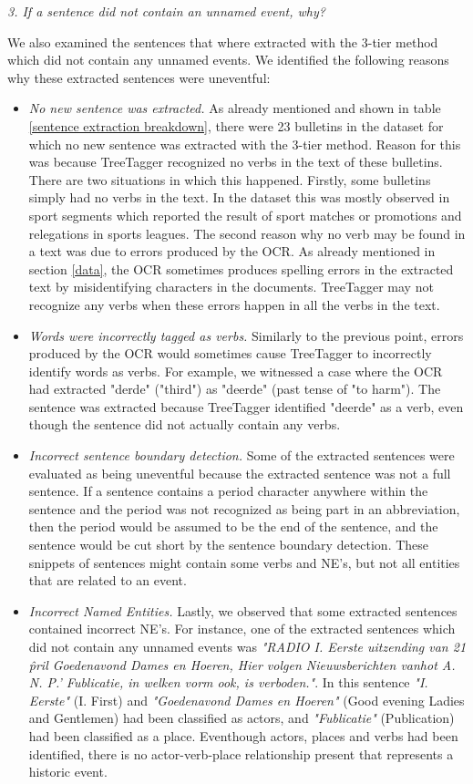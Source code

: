 \documentclass[a4paper, 10pt, conference]{ieeeconf}      %
\begin{document}
\textit{3. If a sentence did not contain an unnamed event, why?}

We also examined the sentences that where extracted with the 3-tier method which did not contain any unnamed events. We identified the following reasons why these extracted sentences were uneventful:

\begin{itemize}
\item \textit{No new sentence was extracted.} As already mentioned and shown in table \ref{sentence extraction breakdown}, there were 23 bulletins in the dataset for which no new sentence was extracted with the 3-tier method. Reason for this was because TreeTagger recognized no verbs in the text of these bulletins. There are two situations in which this happened. Firstly, some bulletins simply had no verbs in the text. In the dataset this was mostly observed in sport segments which reported the result of sport matches or promotions and relegations in sports leagues. The second reason why no verb may be found in a text was due to errors produced by the OCR. As already mentioned in section \ref{data}, the OCR sometimes produces spelling errors in the extracted text by misidentifying characters in the documents. TreeTagger may not recognize any verbs when these errors happen in all the verbs in the text.
\item \textit{Words were incorrectly tagged as verbs.} Similarly to the previous point, errors produced by the OCR would sometimes cause TreeTagger to incorrectly identify words as verbs. For example, we witnessed a case where the OCR had extracted "derde" ("third") as "deerde" (past tense of "to harm"). The sentence was extracted because TreeTagger identified "deerde" as a verb, even though the sentence did not actually contain any verbs.
\item \textit{Incorrect sentence boundary detection.} Some of the extracted sentences were evaluated as being uneventful because the extracted sentence was not a full sentence. If a sentence contains a period character anywhere within the sentence and the period was not recognized as being part in an abbreviation, then the period would be assumed to be the end of the sentence, and the sentence would be cut short by the sentence boundary detection. These snippets of sentences might contain some verbs and NE's, but not all entities that are related to an event.

\item \textit{Incorrect Named Entities.} Lastly, we observed that some extracted sentences contained incorrect NE's. For instance, one of the extracted sentences which did not contain any unnamed events was \textit{"RADIO I. Eerste uitzending van 21 \^pril  Goedenavond Dames en Hoeren, Hier volgen Nieuwsberichten vanhot A. N. P.' Fublicatie, in welken vorm ook, is verboden."}. In this sentence \textit{"I. Eerste"} (I. First) and \textit{"Goedenavond Dames en Hoeren"} (Good evening Ladies and Gentlemen) had been classified as actors, and \textit{"Fublicatie"} (Publication) had been classified as a place. Eventhough actors, places and verbs had been identified, there is no actor-verb-place relationship present that represents a historic event.
\end{itemize}
\end{document}
